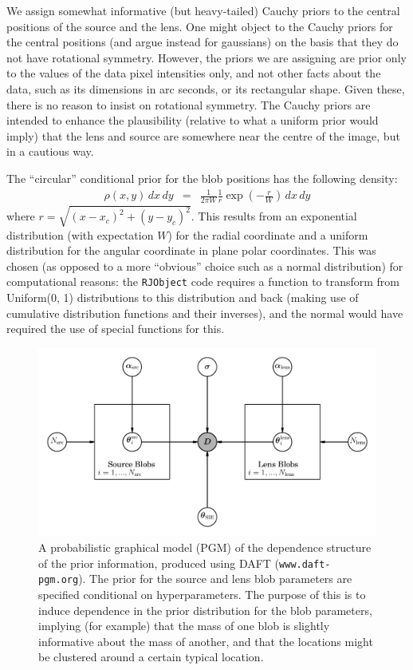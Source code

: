 \documentclass[useAMS,usenatbib]{mn2e}
\begin{document}
We assign somewhat informative (but heavy-tailed)
Cauchy priors to the central positions of the source and the lens.
One might object to the Cauchy priors
for the central positions (and argue instead for gaussians) on the
basis that they do not have rotational symmetry. However, the priors we
are assigning are prior only to the values of the data pixel intensities only,
and not other facts about the data, such as its dimensions in arc seconds, or its
rectangular shape. Given these, there is no reason to insist on rotational
symmetry. The Cauchy priors are intended to enhance the plausibility
(relative to what a uniform prior would imply) that the
lens and source are somewhere near the centre of the image, but in a cautious
way.

The ``circular'' conditional prior for the blob positions has the following
density:
\begin{eqnarray}
\rho(x, y)\, dx \, dy &=&
\frac{1}{2\pi W} \frac{1}{r}\exp\left(-\frac{r}{W}\right) \, dx \, dy
\end{eqnarray}
where $r = \sqrt{(x-x_c)^2 + (y-y_c)^2}$. This results from an exponential
distribution (with expectation $W$) for the radial coordinate and a uniform distribution for the angular coordinate in plane polar coordinates. This was
chosen (as opposed to a more ``obvious'' choice such as a normal distribution)
for computational reasons: the {\tt RJObject} code requires a function to
transform from Uniform(0, 1) distributions to this distribution and back
(making use of cumulative distribution functions and their inverses), and
the normal would have required the use of special functions for this.

\begin{figure}
\includegraphics{pgm.pdf}
\caption{A probabilistic graphical model (PGM) of the dependence structure
of the prior information, produced using DAFT ({\tt www.daft-pgm.org}).
The prior for the source and lens blob parameters are specified conditional
on hyperparameters. The purpose of this is to induce dependence in the prior
distribution for the blob parameters, implying (for example) that the mass of
one blob is slightly informative about the mass of another, and that the
locations might be clustered around a certain typical location.
\label{fig:pgm}}
\end{figure}
\end{document}
